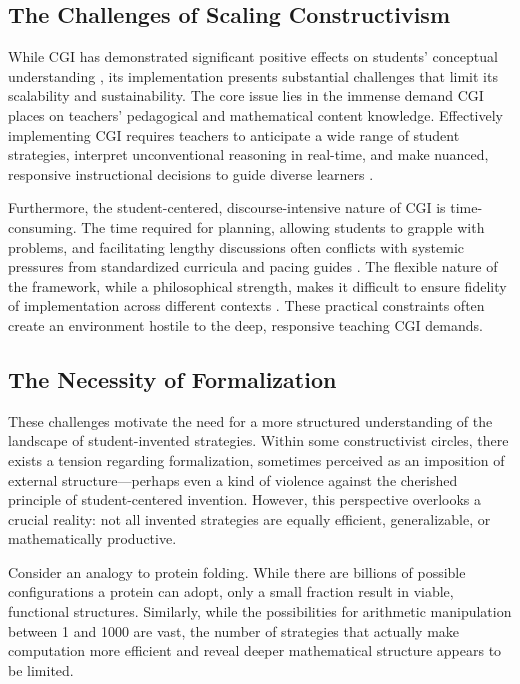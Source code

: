 \documentclass[12pt]{book}
\begin{document}
\subsection{The Challenges of Scaling Constructivism}

While CGI has demonstrated significant positive effects on students' conceptual understanding \parencite{WCER_CGI_Ingenuity}, its implementation presents substantial challenges that limit its scalability and sustainability. The core issue lies in the immense demand CGI places on teachers' pedagogical and mathematical content knowledge. Effectively implementing CGI requires teachers to anticipate a wide range of student strategies, interpret unconventional reasoning in real-time, and make nuanced, responsive instructional decisions to guide diverse learners \parencite{Kennesaw_CGI_Implementation}.

Furthermore, the student-centered, discourse-intensive nature of CGI is time-consuming. The time required for planning, allowing students to grapple with problems, and facilitating lengthy discussions often conflicts with systemic pressures from standardized curricula and pacing guides \parencite{Kennesaw_CGI_Implementation, Hamline_CGI_Curriculum}. The flexible nature of the framework, while a philosophical strength, makes it difficult to ensure fidelity of implementation across different contexts \parencite{TaylorFrancis_CGI_Review}. These practical constraints often create an environment hostile to the deep, responsive teaching CGI demands.

\subsection{The Necessity of Formalization}

These challenges motivate the need for a more structured understanding of the landscape of student-invented strategies. Within some constructivist circles, there exists a tension regarding formalization, sometimes perceived as an imposition of external structure---perhaps even a kind of violence against the cherished principle of student-centered invention. However, this perspective overlooks a crucial reality: not all invented strategies are equally efficient, generalizable, or mathematically productive.

Consider an analogy to protein folding. While there are billions of possible configurations a protein can adopt, only a small fraction result in viable, functional structures. Similarly, while the possibilities for arithmetic manipulation between 1 and 1000 are vast, the number of strategies that actually make computation more efficient and reveal deeper mathematical structure appears to be limited.
\end{document}
